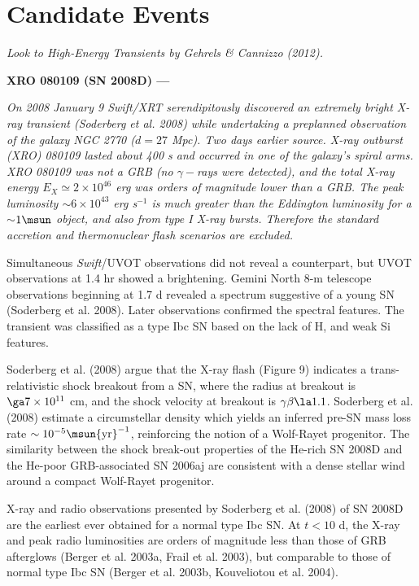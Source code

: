 \section{Candidate Events}\label{section:candidates}


{\em Look to High-Energy Transients by Gehrels \& Cannizzo (2012).  }


{\bf XRO 080109 (SN 2008D) ---} {\it On 2008 January 9 \emph{Swift}/XRT
serendipitously discovered an extremely bright X-ray transient
(Soderberg et al. 2008) while undertaking a preplanned observation
of the galaxy NGC 2770 ($d=27$ Mpc).  Two days earlier
source.  X-ray outburst (XRO) 080109 lasted about 400 s and occurred
in one of the galaxy's spiral arms.  XRO 080109 was not a GRB (no
$\gamma-$rays were detected), and the total X-ray energy $E_X \simeq
2\times 10^{46}$ erg was orders of magnitude lower than a GRB.  The
peak luminosity $\sim$$6\times10^{43}$ erg s$^{-1}$ is much greater
than the Eddington luminosity for a $\sim$$1\msun$ object, and also
from type I X-ray bursts. Therefore the standard accretion and
thermonuclear flash scenarios are excluded.


Simultaneous \emph{Swift}/UVOT 
observations did not reveal a counterpart,
but UVOT observations at 1.4 hr showed a brightening.
Gemini North 8-m telescope 
observations beginning at 1.7 d 
revealed a spectrum   suggestive
of a young SN (Soderberg et al. 2008).
Later observations
confirmed the spectral features.
The transient was classified as
a type Ibc SN based on the lack of H, and weak Si features.


Soderberg et al. (2008) argue that the X-ray flash (Figure 9)
indicates a trans-relativistic shock breakout from a SN, where the
radius at breakout is $\ga7\times 10^{11}$ cm, and the shock velocity
at breakout is $\gamma\beta\la1.1$.  Soderberg et al. (2008) estimate
a circumstellar density which yields an inferred pre-SN mass loss
rate $\sim10^{-5}\msun {\rm yr}^{-1}$, reinforcing the notion of a Wolf-Rayet
progenitor.  The similarity between the shock break-out properties of
the He-rich SN 2008D and the He-poor GRB-associated SN 2006aj are
consistent with a dense stellar wind around a compact Wolf-Rayet
progenitor.


X-ray and radio observations presented by Soderberg et al. (2008) of
SN 2008D are the earliest ever obtained for a normal type Ibc SN.  At
$t < 10$ d, the X-ray and peak radio luminosities are orders of
magnitude less than those of GRB afterglows (Berger et al. 2003a,
Frail et al. 2003), but comparable to those of normal type Ibc SN
(Berger et al. 2003b, Kouveliotou et al. 2004).
}\\


